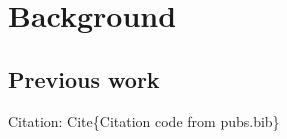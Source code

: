 \chapter{Background}\label{ch:background}

\section{Previous work}

Citation: Cite\{Citation code from pubs.bib\}